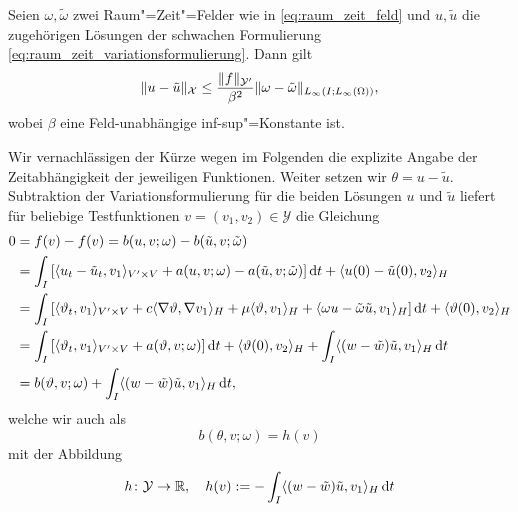 \documentclass[../main.tex]{subfiles}
\begin{document}
\begin{Lemma}
\label{lemma:stabilitaetsaussage}
    Seien $\omega, \tilde{\omega}$ zwei Raum"=Zeit"=Felder wie in \cref{eq:raum_zeit_feld} und $u, \tilde{u}$ die zugehörigen Lösungen der schwachen Formulierung \cref{eq:raum_zeit_variationsformulierung}.
    Dann gilt
    \begin{equation}
        \lVert u - \tilde{u}\rVert_{\mathcal X} \leq \frac{\lVert f\rVert_{\mathcal Y'}}{\beta^{2}} \lVert\omega - \tilde{\omega}\rVert_{L_{\infty}(I; L_{\infty}(\Omega))},
    \end{equation}
    wobei $\beta$ eine Feld-unabhängige inf-sup"=Konstante ist.

    \begin{Beweis}
        Wir vernachlässigen der Kürze wegen im Folgenden die explizite Angabe der Zeitabhängigkeit der jeweiligen Funktionen.
        Weiter setzen wir $\theta = u - \tilde{u}$.
        Subtraktion der Variationsformulierung für die beiden Lösungen $u$ und $\tilde{u}$ liefert für beliebige Testfunktionen $v = (v_{1}, v_{2}) \in \mathcal Y$ die Gleichung
        \begin{align}
            0
            &= f(v) - f(v) = b(u, v; \omega) - b(\tilde{u}, v; \tilde{\omega})
           \\&= \int_{I} \left[ \langle u_{t} - \tilde{u}_{t},v_{1}\rangle_{V' \times V} + a(u, v; \omega) - a(\tilde{u}, v; \tilde{\omega}) \right] \mathop{}\!\mathrm{d} t + \langle u(0) - \tilde{u}(0),v_{2}\rangle_{H}
           \\&= \int_{I} \left[ \langle\vartheta_{t},v_{1}\rangle_{V' \times V} + c \langle\nabla \vartheta,\nabla v_{1}\rangle_{H} + \mu \langle\vartheta,v_{1}\rangle_{H} + \langle\omega u - \tilde{\omega}\tilde{u},v_{1}\rangle_{H} \right] \mathop{}\!\mathrm{d} t + \langle\vartheta(0),v_{2}\rangle_{H}
           \\&= \int_{I} \left[ \langle\vartheta_{t},v_{1}\rangle_{V' \times V} + a(\vartheta, v; \omega) \right] \mathop{}\!\mathrm{d} t + \langle\vartheta(0),v_{2}\rangle_{H} + \int_{I} \langle(w - \tilde{w})\tilde{u},v_{1}\rangle_{H} \mathop{}\!\mathrm{d} t
           \\&= b(\vartheta, v; \omega) + \int_{I} \langle(w - \tilde{w})\tilde{u},v_{1}\rangle_{H} \mathop{}\!\mathrm{d} t,
        \end{align}
        welche wir auch als
        \begin{equation}
            \label{eq:stabilitaetsaussage:beweis:variationsproblem}
            b(\theta, v; \omega) = h(v)
        \end{equation}
        mit der Abbildung
        \begin{equation}
            h \colon \mathcal Y \to \mathbb{R}, \quad h(v) := - \int_{I} \skp{(w - \tilde{w})\tilde{u}}{v_{1}}{H} \diff t

\end{equation}
\end{Beweis}
\end{Lemma}
\end{document}
